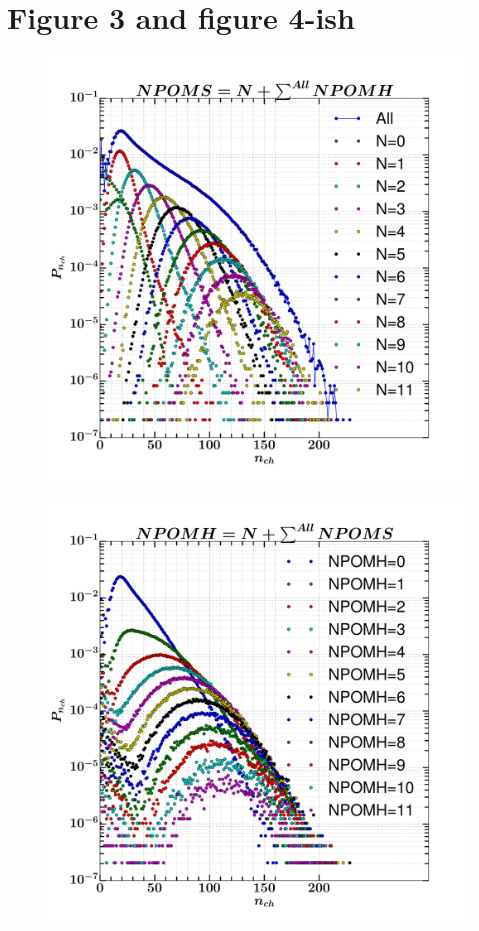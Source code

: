 \documentclass[]{article}
\begin{document}
\newpage
\section*{\centering Figure 3 and figure 4-ish}
\begin{figure}[h!]
    \centering
    \includegraphics[scale=0.5]{../analyzed/N_NPOMS_All_NPOMH.pdf}
    \caption[NPOMS=N and all NPOMH]{}
\end{figure}
\begin{figure}[h!]
    \centering
    \includegraphics[scale=0.5]{../analyzed/N_NPOMH_All_NPOMS.pdf}
    \caption[NPOMH=N and all NPOMS]{}
\end{figure}
\end{document}
